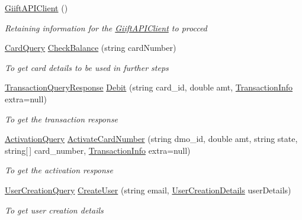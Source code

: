 \begin{DoxyCompactItemize}
\item 
\hyperlink{class_giift_a_p_i_c_sharp_1_1_giift_a_p_i_client_ac49da1be3ebd8564216b7ef79cdf41ea}{Giift\+A\+P\+I\+Client} ()
\begin{DoxyCompactList}\small\item\em Retaining information for the \hyperlink{class_giift_a_p_i_c_sharp_1_1_giift_a_p_i_client}{Giift\+A\+P\+I\+Client} to procced \end{DoxyCompactList}\item 
\hyperlink{class_giift_a_p_i_c_sharp_1_1_card_query}{Card\+Query} \hyperlink{class_giift_a_p_i_c_sharp_1_1_giift_a_p_i_client_a3cc1b6eadcdf5fea49f33b591b101782}{Check\+Balance} (string card\+Number)
\begin{DoxyCompactList}\small\item\em To get card details to be used in further steps \end{DoxyCompactList}\item 
\hyperlink{class_giift_a_p_i_c_sharp_1_1_transaction_query_response}{Transaction\+Query\+Response} \hyperlink{class_giift_a_p_i_c_sharp_1_1_giift_a_p_i_client_a8324e05441c2f9fbeedfb4ca4a5589ab}{Debit} (string card\+\_\+id, double amt, \hyperlink{class_giift_a_p_i_c_sharp_1_1_transaction_info}{Transaction\+Info} extra=null)
\begin{DoxyCompactList}\small\item\em To get the transaction response \end{DoxyCompactList}\item 
\hyperlink{class_giift_a_p_i_c_sharp_1_1_activation_query}{Activation\+Query} \hyperlink{class_giift_a_p_i_c_sharp_1_1_giift_a_p_i_client_a09e5a5e4af058ddc6ee72ebf8073af50}{Activate\+Card\+Number} (string dmo\+\_\+id, double amt, string state, string\mbox{[}$\,$\mbox{]} card\+\_\+number, \hyperlink{class_giift_a_p_i_c_sharp_1_1_transaction_info}{Transaction\+Info} extra=null)
\begin{DoxyCompactList}\small\item\em To get the activation response \end{DoxyCompactList}\item 
\hyperlink{class_giift_a_p_i_c_sharp_1_1_user_creation_query}{User\+Creation\+Query} \hyperlink{class_giift_a_p_i_c_sharp_1_1_giift_a_p_i_client_a46db39b0aaaca40361210625fd4ba3ae}{Create\+User} (string email, \hyperlink{class_giift_a_p_i_c_sharp_1_1_user_creation_details}{User\+Creation\+Details} user\+Details)
\begin{DoxyCompactList}\small\item\em To get user creation details \end{DoxyCompactList}\item 

\end{DoxyCompactItemize}
